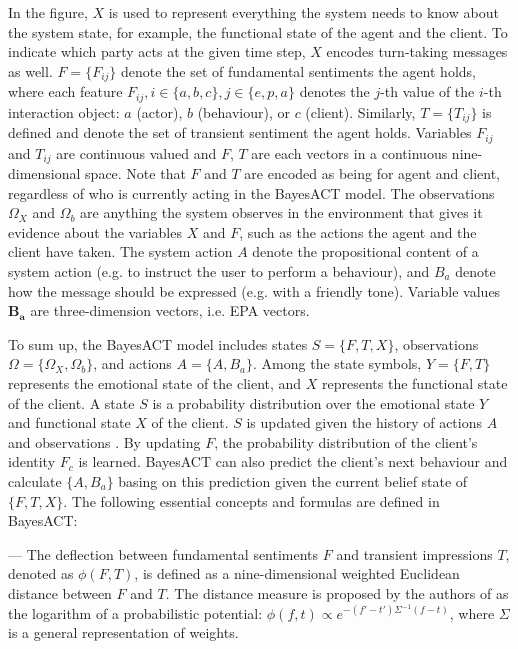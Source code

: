 In the figure, $X$ is used to represent everything the system needs to know about the system state, for example, the functional state of the agent and the client. To indicate which party acts at the given time step, $X$ encodes turn-taking messages as well. $F = \{F_{ij}\}$ denote the set of fundamental sentiments the agent holds, where each feature $F_{ij}, i \in \{a, b, c\}, j \in \{e, p, a\}$ denotes the $j$-th value of the $i$-th interaction object: $a$ (actor), $b$ (behaviour), or $c$ (client). Similarly, $T = \{T_{ij}\}$ is defined and denote the set of transient sentiment the agent holds. Variables $F_{ij}$ and $T_{ij}$ are continuous valued and $F$, $T$ are each vectors in a continuous nine-dimensional space. Note that $F$ and $T$ are encoded as being for agent and client, regardless of who is currently acting in the BayesACT model. The observations $\Omega_{X}$ and $\Omega_{b}$ are anything the system observes in the environment that gives it evidence about the variables $X$ and $F$, such as the actions the agent and the client have taken. The system action $A$ denote the propositional content of a system action (e.g. to instruct the user to perform a behaviour), and $B_{a}$ denote how the message should be expressed (e.g. with a friendly tone). Variable values $\mathbf{B_{a}}$ are three-dimension vectors, i.e. EPA vectors.

To sum up, the BayesACT model includes states $S = \{F, T, X\}$, observations $\Omega = \{\Omega_{X}, \Omega_{b}\}$, and actions $A = \{A, B_{a}\}$. Among the state symbols, $Y = \{F, T\}$ represents the emotional state of the client, and $X$ represents the functional state of the client. A state $S$ is a probability distribution over the emotional state $Y$ and functional state $X$ of the client. $S$ is updated given the history of actions $A$ and observations . By updating $F$, the probability distribution of the client's identity $F_{c}$ is learned. BayesACT can also predict the client's next behaviour and calculate $\{A, B_{a}\}$ basing on this prediction given the current belief state of $\{F, T, X\}$. The following essential concepts and formulas are defined in BayesACT:

--- The deflection between fundamental sentiments $F$ and transient impressions $T$, denoted as  $\phi(F, T)$, is defined as a nine-dimensional weighted Euclidean distance between $F$ and $T$. The distance measure is proposed by the authors of \cite{hoey2013bayesian} as the logarithm of a probabilistic potential: $\phi(f,t) \propto e^{-(f'-t')\Sigma^{-1}(f-t)}$, where $\Sigma$ is a general representation of weights. 

